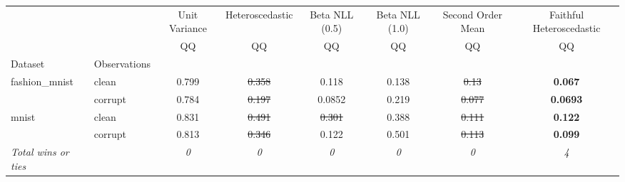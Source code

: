 \begin{tabular}{ll|c|c|c|c|c|c}
\toprule
{} & {} & {Unit Variance} & {Heteroscedastic} & {Beta NLL (0.5)} & {Beta NLL (1.0)} & {Second Order Mean} & {Faithful Heteroscedastic} \\
{} & {} & {QQ} & {QQ} & {QQ} & {QQ} & {QQ} & {QQ} \\
{Dataset} & {Observations} & {} & {} & {} & {} & {} & {} \\
\midrule
\multirow[t]{2}{*}{fashion_mnist} & clean & 0.799 & \sout{0.358} & 0.118 & 0.138 & \sout{0.13} & \textbf{0.067} \\
 & corrupt & 0.784 & \sout{0.197} & 0.0852 & 0.219 & \sout{0.077} & \textbf{0.0693} \\
\multirow[t]{2}{*}{mnist} & clean & 0.831 & \sout{0.491} & \sout{0.301} & 0.388 & \sout{0.111} & \textbf{0.122} \\
 & corrupt & 0.813 & \sout{0.346} & 0.122 & 0.501 & \sout{0.113} & \textbf{0.099} \\
\textit{{Total wins or ties}} &  & \textit{0} & \textit{0} & \textit{0} & \textit{0} & \textit{0} & \textit{4} \\
\bottomrule
\end{tabular}
